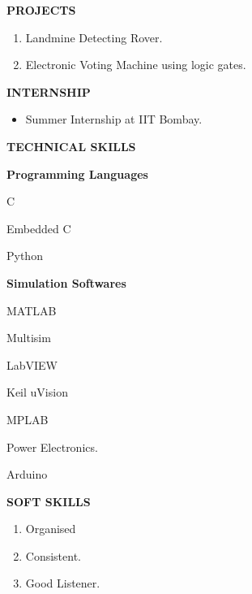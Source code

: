\documentclass[]{article}
\begin{document}
 
 \begin{flushleft}	                                  
  \vspace{0.15in}
{\large \bf PROJECTS}                                                                 
 \begin{enumerate}	
 \vspace{-0.1in}	                                 
 \addtolength{\itemindent}{1in}
\item  Landmine Detecting Rover.
\item  Electronic Voting Machine using logic gates.
\end{enumerate}
\end{flushleft}


\begin{flushleft}
\vspace{0.15in}
{\large \bf INTERNSHIP}
\begin{itemize}
\hspace{0.5in}
\vspace{-0.22in}
\addtolength{\itemindent}{1in}
\item Summer Internship at IIT Bombay.
\end{itemize}
\end{flushleft}


\begin{flushleft}
\vspace{0.15in}
{\large \bf TECHNICAL SKILLS}
\begin{itemize}
\hspace{0.5in}
{\bf Programming Languages}
{
\addtolength{\itemindent}{1in}
\item C

\item Embedded C
\item Python\
}

\hspace{0.5in}
{\bf Simulation Softwares}
{
\addtolength{\itemindent}{1in}
\item MATLAB
\item Multisim
\item LabVIEW
\item Keil uVision
\item MPLAB


\item Power Electronics.
\item Arduino
}
\end{itemize}
\end{flushleft}


\begin{flushleft}

\vspace{0.15in}
{\large \bf SOFT SKILLS}
\begin{enumerate}
\hspace{0.5in}
\vspace{-0.22in}
\addtolength{\itemindent}{1in}
\item Organised
\item Consistent.
\item Good Listener.
\end{enumerate}
\end{flushleft}
\end{document}
